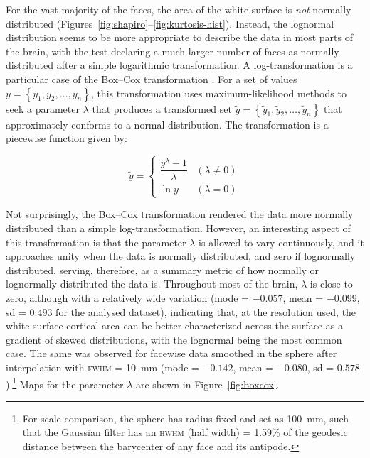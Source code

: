 For the vast majority of the faces, the area of the white surface is \emph{not} normally distributed (Figures~\ref{fig:shapiro}--\ref{fig:kurtosis-hist}). Instead, the lognormal distribution seems to be more appropriate to describe the data in most parts of the brain, with the test declaring a much larger number of faces as normally distributed after a simple logarithmic transformation. A log-transformation is a particular case of the Box--Cox transformation \citep{Box1964}. For a set of values $y=\left\{ y_1, y_2, \ldots , y_n \right\}$, this transformation uses maximum-likelihood methods to seek a parameter $\lambda$ that produces a transformed set $\tilde{y}=\left\{ \tilde{y}_1, \tilde{y}_2, \ldots , \tilde{y}_n \right\}$ that approximately conforms to a normal distribution. The transformation is a piecewise function given by:

\begin{equation}
\tilde{y} = \left\{ \begin{array}{ll}
\dfrac{y^{\lambda}-1}{\lambda} & (\lambda \neq 0) \\
\ln y & (\lambda = 0)
\end{array} \right.
\end{equation}

Not surprisingly, the Box--Cox transformation rendered the data more normally distributed than a simple log-transformation. However, an interesting aspect of this transformation is that the parameter $\lambda$ is allowed to vary continuously, and it approaches unity when the data is normally distributed, and zero if lognormally distributed, serving, therefore, as a summary metric of how normally or lognormally distributed the data is. Throughout most of the brain, $\lambda$ is close to zero, although with a relatively wide variation (mode = $-0.057$, mean = $-0.099$, sd = $0.493$ for the analysed dataset), indicating that, at the resolution used, the white surface cortical area can be better characterized across the surface as a gradient of skewed distributions, with the lognormal being the most common case. The same was observed for facewise data smoothed in the sphere after interpolation with \textsc{fwhm} = 10~mm (mode = $-0.142$, mean = $-0.080$, sd = $0.578$).\footnote{For scale comparison, the sphere has radius fixed and set as 100~mm, such that the Gaussian filter has an \textsc{hwhm} (half width) = 1.59\% of the geodesic distance between the barycenter of any face and its antipode.} Maps for the parameter $\lambda$ are shown in Figure~\ref{fig:boxcox}.

